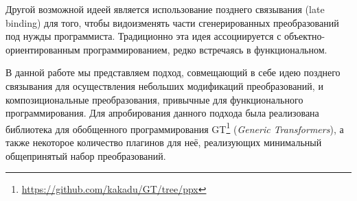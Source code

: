  Другой возможной идеей является использование  позднего связывания (late binding) для того, чтобы видоизменять части сгенерированных преобразований под нужды программиста. Традиционно эта идея ассоциируется с объектно-ориентированным программированием, редко встречаясь в функциональном.
 
 
 В данной работе мы представляем подход, совмещающий в себе идею 
 позднего связывания для осуществления небольших модификаций преобразований, и композициональные преобразования, привычные для функционального программирования. Для апробирования данного подхода была реализована библиотека для обобщенного программирования \textsc{GT}\footnote{\url{https://github.com/kakadu/GT/tree/ppx}} (\emph{Generic Transformers}), а также некоторое количество плагинов для неё, реализующих минимальный общепринятый набор преобразований.
 
 
 
 